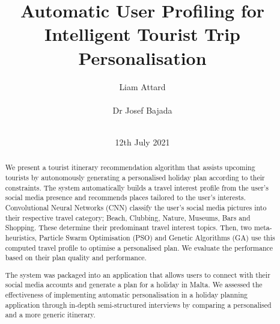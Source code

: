 \documentclass{sig-alternate}
\begin{document}
\title{Automatic User Proﬁling for Intelligent
Tourist Trip Personalisation}
\author{
\alignauthor
Liam Attard\\
       \\
\alignauthor
Dr Josef Bajada\\
       \\
}

\date{12th July 2021}

\makeatletter
\def\@copyrightspace{\relax}
\makeatother

\maketitle
\begin{abstract}

We present a tourist itinerary recommendation
algorithm that assists upcoming tourists by
autonomously generating a personalised holiday plan
according to their constraints. The system
automatically builds a travel interest profile from
the user's social media presence and recommends places
tailored to the user's interests.  Convolutional
Neural Networks (CNN) classify the user's social media
pictures into their respective travel category; Beach,
Clubbing, Nature, Museums, Bars and Shopping. These
determine their predominant travel interest topics.
Then, two meta-heuristics, Particle Swarm
Optimisation (PSO) and Genetic Algorithms (GA) use this
computed travel profile to optimise a personalised
plan. We evaluate the performance based on their plan
quality and performance.

The system was packaged into an application that
allows users to connect with their social media
accounts and generate a plan for a holiday in Malta.
We assessed the effectiveness of implementing
automatic personalisation in a holiday planning
application through in-depth semi-structured
interviews by comparing a personalised and a more
generic itinerary.


\end{abstract}












\end{document}
